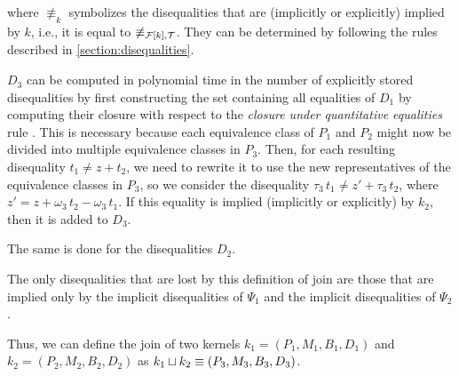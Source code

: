 where $\nequiv_{k}$ symbolizes the disequalities that are (implicitly or explicitly) implied by $k$, i.e.,
it is equal to $\not\equiv_{\mathcal{F}[k],\mathcal{T}}$.
They can be determined by following the rules described in \cref{section:disequalities}.

$D_3$ can be computed in polynomial time in the number of explicitly stored disequalities by first constructing the set containing all equalities of $D_1$ by computing their closure with respect to the \emph{closure under quantitative equalities} rule .
This is necessary because each equivalence class of $P_1$ and $P_2$ might now be divided into multiple equivalence classes in $P_3$.
Then, for each resulting disequality $t_1 \neq z + t_2$,
we need to rewrite it to use the new representatives of the equivalence classes in $P_3$,
so we consider the disequality $\tau_3\,t_1 \neq z' + \tau_3\,t_2$,
where $z' = z + \omega_3\,t_2 - \omega_3\,t_1$.
If this equality is implied (implicitly or explicitly) by $k_2$, then it is added to $D_3$.

The same is done for the disequalities $D_2$.

The only disequalities that are lost by this definition of join are those that are implied only by the implicit disequalities of $\Psi_1$ and the implicit disequalities of $\Psi_2$.

Thus, we can define the join of two kernels $k_1 = (P_1, M_1,B_1, D_1)$ and $k_2 = (P_2, M_2,B_2, D_2)$ as $k_1 \sqcup k_2 \equiv (P_3, M_3,B_3, D_3)$.
